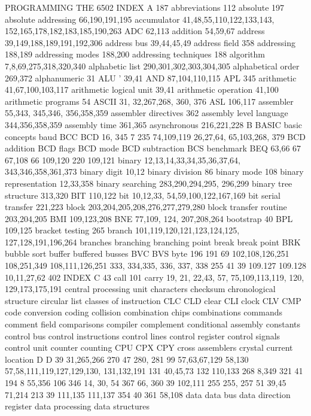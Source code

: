 {{{{{{{{{{{{{{{{{{{{{{{{{{{{{{{{{{{{{{{{{{{{{{{{{{{{{{{{{{{{{{{{{{{{{{{{{{{{{{{{{{{{{{{{{{{{{{{{{{{{{{{{{{{{{{{{{{{{{{{{{{{{{{{{{{{{{{{{{{{{PROGRAMMING THE 6502
INDEX
A 187
abbreviations 112
absolute 197
absolute addressing 66,190,191,195
accumulator 41,48,55,110,122,133,143,
152,165,178,182,183,185,190,263
ADC 62,113
addition 54,59,67
address 39,149,188,189,191,192,306
address bus 39,44,45,49
address field 358
addressing 188,189
addressing modes 188,200
addressing techniques 188
algorithm 7,8,69,275,318,320,340
alphabetic list 290,301,302,303,304,305
alphabetical order 269,372
alphanumeric 31
ALU ' 39,41
AND 87,104,110,115
APL 345
arithmetic 41,67,100,103,117
arithmetic logical unit 39,41
arithmetic operation 41,100
arithmetic programs 54
ASCII 31, 32,267,268, 360, 376
ASL 106,117
assembler 55,343, 345,346, 356,358,359
assembler directives 362
assembly level language 344,356,358,359
assembly time 361,365
asynchronous 216,221,228
B
BASIC
basic concepts
baud
BCC
BCD
16, 345
7
235
74,109,119
26,27,64, 65,103,268, 379
BCD addition
BCD flags
BCD mode
BCD subtraction
BCS
benchmark
BEQ
63,66
67
67,108
66
109,120
220
109,121
binary 12,13,14,33,34,35,36,37,64,
343,346,358,361,373
binary digit 10,12
binary division 86
binary mode 108
binary representation 12,33,358
binary searching 283,290,294,295,
296,299
binary tree structure 313,320
BIT 110,122
bit 10,12,33, 54,59,100,122,167,169
bit serial transfer 221,223
block 203,204,205,208,276,277,279,280
block transfer routine 203,204,205
BMI 109,123,208
BNE 77,109, 124, 207,208,264
bootstrap 40
BPL 109,125
bracket testing 265
branch 101,119,120,121,123,124,125,
127,128,191,196,264
branches
branching
branching point
break
break point
BRK
bubble sort
buffer
buffered
busses
BVC
BVS
byte
196
191
69
102,108,126,251
108,251,349
108,111,126,251
333, 334,335, 336, 337, 338
255
41
39
109.127
109.128
10,11,27,62
402
INDEX
C 43
call 101
carry 19, 21, 22,43, 57, 75,109,113,119,
120, 129,173,175,191
central processing unit
characters
checksum
chronological structure
circular list
classes of instruction
CLC
CLD
clear
CLI
clock
CLV
CMP
code conversion
coding
collision
combination chips
combinations
commands
comment field
comparisons
compiler
complement
conditional assembly
constants
control bus
control instructions
control lines
control register
control signals
control unit
counter
counting
CPU
CPX
CPY
cross assemblers
crystal
current location
D
D
39
31,265,266
270
47
280, 281
99
57,63,67,129
58,130
57,58,111,119,127,129,130,
131,132,191
131
40,45,73
132
110,133
268
8,349
321
41
194
8
55,356
106
346
14, 30, 54
367
66, 360
39
102,111
255
255, 257
51
39,45
71,214
213
39
111,135
111,137
354
40
361
58,108
data
data bus
data direction register
data processing
data structures
}}}}}}}}}}}}}}}}}}}}}}}}}}}}}}}}}}}}}}}}}}}}}}}}}}}}}}}}}}}}}}}}}}}}}}}}}}}}}}}}}}}}}}}}}}}}}}}}}}}}}}}}}}}}}}}}}}}}}}}}}}}}}}}}}}}}}}}}}}}}
